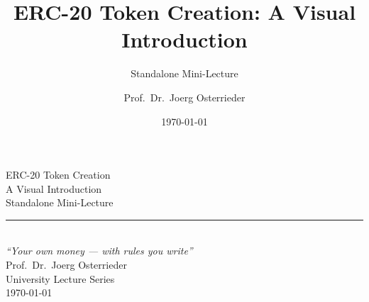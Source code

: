 \documentclass[8pt,aspectratio=169]{beamer}
\title{ERC-20 Token Creation: A Visual Introduction}
\subtitle{Standalone Mini-Lecture}
\author{Prof.~Dr.~Joerg Osterrieder}
\institute{University Lecture Series}
\date{\today}
\begin{document}
\begin{frame}[plain]
\vspace{2cm}
\begin{center}
{\Huge\color{mlpurple} ERC-20 Token Creation}\\[0.4cm]
{\Large\color{mlblue} A Visual Introduction}\\[0.3cm]
{\normalsize Standalone Mini-Lecture}\\[0.3cm]
\textcolor{mlgray}{\rule{6cm}{0.4pt}}\\[0.3cm]
{\small\itshape ``Your own money --- with rules you write''}\\[1.5cm]
{\normalsize Prof.~Dr.~Joerg Osterrieder}\\[0.2cm]
{\small University Lecture Series}\\[0.2cm]
{\small \today}
\end{center}
\end{frame}
\end{document}

